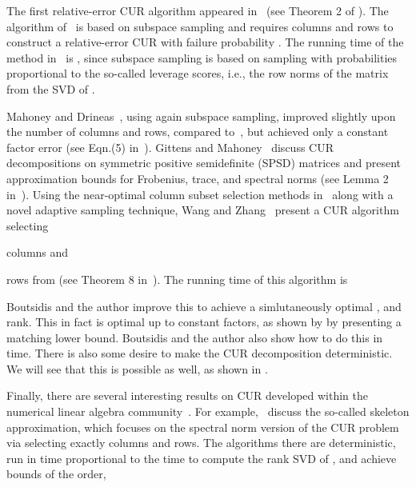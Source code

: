 \documentclass[11pt]{article}
\begin{document}
The first relative-error CUR algorithm appeared in~\cite{DMM08} (see Theorem 2 of \cite{DMM08}). The
algorithm of~\cite{DMM08} is based on subspace sampling and requires 
 columns and
 rows to construct a relative-error CUR with failure probability .
The running time of the method in~\cite{DMM08} is , since subspace sampling is based on sampling with probabilities
proportional to the so-called leverage scores, i.e., the row norms of the matrix  from the SVD of .

Mahoney and Drineas~\cite{DM09}, using again subspace sampling, improved slightly upon the number of columns and rows,
compared to~\cite{DMM08}, but achieved only a constant factor error (see Eqn.(5) in~\cite{DM09}).
Gittens and Mahoney~\cite{GM13} discuss CUR decompositions on symmetric positive semidefinite (SPSD) 
matrices and present approximation bounds for Frobenius,
trace, and spectral norms (see Lemma 2 in~\cite{GM13}).
Using the near-optimal column subset selection methods in~\cite{BDM11a} along with a novel adaptive sampling technique, Wang and Zhang~\cite{WZ13CUR} present a CUR
algorithm selecting

columns and

rows from 
(see Theorem 8 in~\cite{WZ13CUR}).
The running time of this algorithm is

Boutsidis and the author \cite{BW14} improve this to achieve a simlutaneously optimal , and rank. 
This in fact is optimal up to constant factors, as shown by \cite{BW14} by presenting a matching lower bound. 
Boutsidis and the author also show how to do this in  time. 
There is also some desire to make the CUR decomposition deterministic. 
We will see that this is possible as well, as shown in \cite{BW14}. 

Finally, there are several interesting results on CUR developed within 
the numerical linear algebra community~\cite{Tyr96, Tyr00, GTZ97a, GTZ97b,HP97, Pan03, MG03, GM04,BPSS05,Ste99}.
For example,~\cite{Tyr96, Tyr00, GTZ97a, GTZ97b} discuss the so-called skeleton approximation, which focuses on the spectral norm
version of the CUR problem via selecting exactly  columns and  rows. The algorithms there are deterministic, run
in time proportional to the time to compute the rank  SVD of , and achieve bounds of the order,
\end{document}
